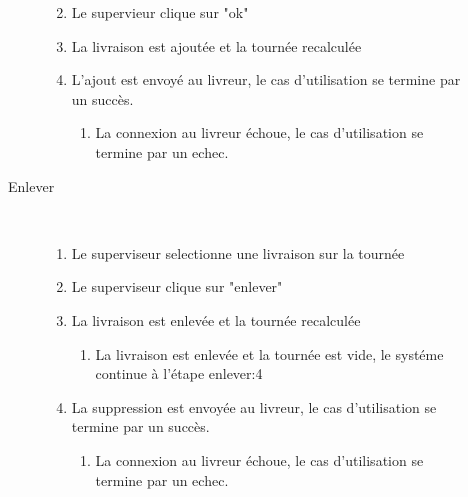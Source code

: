 \begin{description}
\begin{description}
\begin{enumerate}
\begin{enumerate}
            \end{enumerate}
            \item Le supervieur clique sur "ok"
            \item La livraison est ajout\'ee et la tourn\'ee recalcul\'ee
            \item L'ajout est envoy\'e au livreur, le cas d'utilisation se termine par un succ\`es.
            \begin{enumerate}
                \item La connexion au livreur \'echoue, le cas d'utilisation se termine par un echec.
            \end{enumerate}
        \end{enumerate}
        \item[Enlever] ~
        \begin{enumerate}
            \item Le superviseur selectionne une livraison sur la tourn\'ee
            \item Le superviseur clique sur "enlever"
            \item La livraison est enlev\'ee et la tourn\'ee recalcul\'ee
            \begin{enumerate}
                \item La livraison est enlev\'ee et la tourn\'ee est vide, le syst\'eme continue \`a l'\'etape enlever:4
            \end{enumerate}
            \item La suppression est envoy\'ee au livreur, le cas d'utilisation se termine par un succ\`es.
            \begin{enumerate}
                \item La connexion au livreur \'echoue, le cas d'utilisation se termine par un echec.
            \end{enumerate}
        \end{enumerate}
    \end{description}
\end{description}
\pagebreak

